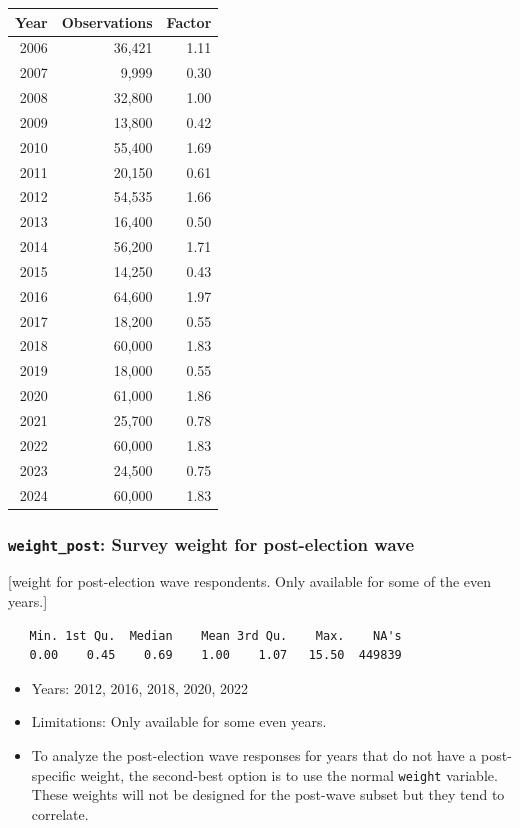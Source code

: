 \documentclass[10pt,article,oneside]{memoir}
\begin{document}
\begin{center}

\begin{table}[H]
\centering
\begin{tabular}[t]{rrr}
\toprule
Year & Observations & Factor\\
\midrule
2006 & 36,421 & 1.11\\
2007 & 9,999 & 0.30\\
2008 & 32,800 & 1.00\\
2009 & 13,800 & 0.42\\
2010 & 55,400 & 1.69\\
2011 & 20,150 & 0.61\\
2012 & 54,535 & 1.66\\
2013 & 16,400 & 0.50\\
2014 & 56,200 & 1.71\\
2015 & 14,250 & 0.43\\
2016 & 64,600 & 1.97\\
2017 & 18,200 & 0.55\\
2018 & 60,000 & 1.83\\
2019 & 18,000 & 0.55\\
2020 & 61,000 & 1.86\\
2021 & 25,700 & 0.78\\
2022 & 60,000 & 1.83\\
2023 & 24,500 & 0.75\\
2024 & 60,000 & 1.83\\
\bottomrule
\end{tabular}
\end{table}
\end{center}

\subsubsection{\texorpdfstring{\texttt{weight\_post}: Survey weight for
post-election
wave}{weight\_post: Survey weight for post-election wave}}\label{weight_post-survey-weight-for-post-election-wave}

{[}weight for post-election wave respondents. Only available for some of
the even years.{]}

\begin{verbatim}
   Min. 1st Qu.  Median    Mean 3rd Qu.    Max.    NA's 
   0.00    0.45    0.69    1.00    1.07   15.50  449839 
\end{verbatim}

\begin{itemize}
\tightlist
\item
  Years: 2012, 2016, 2018, 2020, 2022
\item
  Limitations: Only available for some even years.
\item
  To analyze the post-election wave responses for years that do not have
  a post-specific weight, the second-best option is to use the normal
  \texttt{weight} variable. These weights will not be designed for the
  post-wave subset but they tend to correlate.
\end{itemize}
\end{document}
